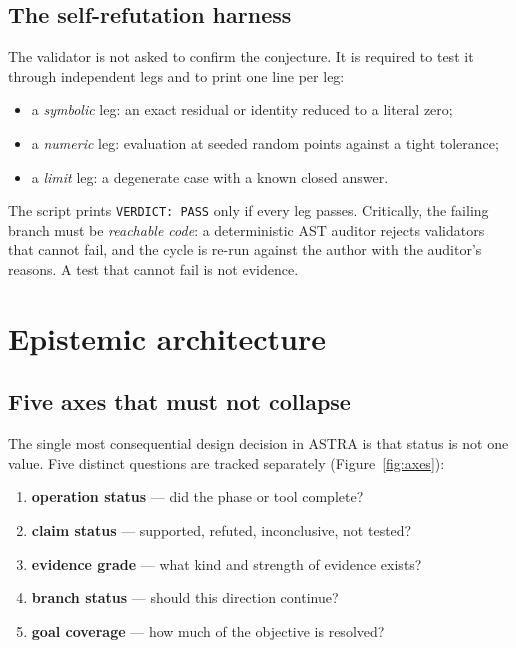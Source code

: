 \documentclass[11pt,a4paper]{article}
\newcommand{\code}[1]{\texttt{\small #1}}
\begin{document}
\subsection{The self-refutation harness}

The validator is not asked to confirm the conjecture. It is required to test it
through independent legs and to print one line per leg:

\begin{itemize}[leftmargin=*,itemsep=0pt]
  \item a \emph{symbolic} leg: an exact residual or identity reduced to a
        literal zero;
  \item a \emph{numeric} leg: evaluation at seeded random points against a tight
        tolerance;
  \item a \emph{limit} leg: a degenerate case with a known closed answer.
\end{itemize}

The script prints \code{VERDICT: PASS} only if every leg passes. Critically, the
failing branch must be \emph{reachable code}: a deterministic AST auditor
rejects validators that cannot fail, and the cycle is re-run against the author
with the auditor's reasons. A test that cannot fail is not evidence.

\section{Epistemic architecture}
\label{sec:axes}

\subsection{Five axes that must not collapse}

The single most consequential design decision in ASTRA is that status is not one
value. Five distinct questions are tracked separately (Figure~\ref{fig:axes}):

\begin{enumerate}[leftmargin=*,itemsep=0pt]
  \item \textbf{operation status} --- did the phase or tool complete?
  \item \textbf{claim status} --- supported, refuted, inconclusive, not tested?
  \item \textbf{evidence grade} --- what kind and strength of evidence exists?
  \item \textbf{branch status} --- should this direction continue?
  \item \textbf{goal coverage} --- how much of the objective is resolved?
\end{enumerate}
\end{document}
